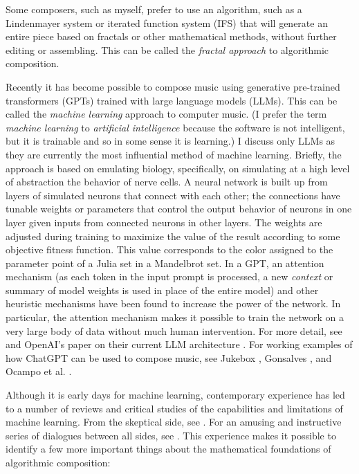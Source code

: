 \documentclass[11pt]{scrartcl}
\begin{document}
Some composers, such as myself, prefer to use an algorithm, such as a Lindenmayer system \parencite{algorithmicbeautyofplants, prusinkiewicz1986sgs,  fractalmusicwithstringrewritinggrammars} or iterated function system (IFS) \parencite{fractalseverywhere, ifsmusic} that will generate an entire piece based on fractals or other mathematical methods, without further editing or assembling. This can be called the \emph{fractal approach} to algorithmic composition.

Recently it has become possible to compose music using generative pre-trained transformers (GPTs) trained with large language models (LLMs). This can be called the \emph{machine learning} approach to computer music. (I prefer the term \emph{machine learning} to \emph{artificial intelligence} because the software is not intelligent, but it is trainable and so in some sense it is learning.) I discuss only LLMs as they are currently the most influential method of machine learning. Briefly, the approach is based on emulating biology, specifically, on simulating at a high level of abstraction the behavior of nerve cells. A neural network is built up from layers of simulated neurons that connect with each other; the connections have tunable weights or parameters that control the output behavior of neurons in one layer given inputs from connected neurons in other layers. The weights are adjusted during training to maximize the value of the result according to some objective fitness function. This value corresponds to the color assigned to the parameter point of a Julia set in a Mandelbrot set. In a GPT, an attention mechanism \parencite{vaswani2017attention} (as each token in the input prompt is processed, a new \emph{context} or summary of model weights is used in place of the entire model) and other heuristic mechanisms have been found to increase the power of the network. In particular, the attention mechanism makes it possible to train the network on a very large body of data without much human intervention. For more detail, see \parencite{zhang2023complete} and OpenAI's paper on their current LLM architecture \parencite{openai2023gpt4}. For working examples of how ChatGPT can be used to compose music, see Jukebox \parencite{openai2023jukebox}, Gonsalves \parencite{aitunes}, and Ocampo et al. \parencite{ocampo2023using}.

Although it is early days for machine learning, contemporary experience has led to a number of reviews and critical studies of the capabilities and limitations of machine learning. From the skeptical side, see \parencite{dale2021gpt}. For an amusing and instructive series of dialogues between all sides, see \parencite{shtetl}. This experience makes it possible to identify a few more important things about the mathematical foundations of algorithmic composition:
\end{document}
